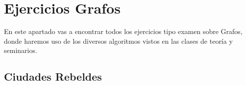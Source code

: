 \chapter{Ejercicios Grafos}
En este apartado vas a encontrar todos los ejercicios tipo examen sobre Grafos, donde haremos uso de los diversos algoritmos vistos en las clases de teoría y seminarios.

\section*{Ciudades Rebeldes}
{}
\label{sec:EjercicioGrafos1}


% 

% 

% 